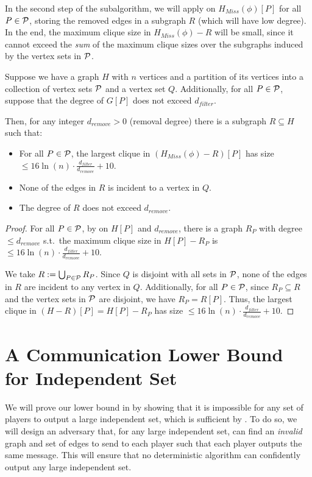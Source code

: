 \documentclass[11pt]{article}
\begin{document}
In the second step of the subalgorithm, we will apply  on $H_{Miss}(\phi)[P]$ for all $P\in \mathcal{P}$, storing the removed edges in a subgraph $R$ (which will have low degree). In the end, the maximum clique size in $H_{Miss}(\phi)-R$ will be small, since it cannot exceed the \textit{sum} of the maximum clique sizes over the subgraphs induced by the vertex sets in $\mathcal{P}$.

\begin{lemma}\label{algo-second-step}
Suppose we have a graph $H$ with $n$ vertices and a partition of its vertices into a collection of vertex sets $\mathcal{P}$ and a vertex set $Q$. Additionally, for all $P\in \mathcal{P}$, suppose that the degree of $G[P]$ does not exceed $d_{filter}$.

Then, for any integer $d_{remove}>0$ (removal degree) there is a subgraph $R\subseteq H$ such that: 
\begin{itemize}
\item For all $P\in \mathcal{P}$, the largest clique in $(H_{Miss}(\phi)-R)[P]$ has size $\le 16\ln(n)\cdot \frac{d_{filter}}{d_{remove}}+10$. 
\item None of the edges in $R$ is incident to a vertex in $Q$. 
\item The degree of $R$ does not exceed $d_{remove}$. 
\end{itemize}
\end{lemma}
\begin{proof}
For all $P\in \mathcal{P}$, by  on $H[P]$ and $d_{remove}$, there is a graph $R_P$ with degree $\le d_{remove}$ s.t.\ the maximum clique size in $H[P]-R_P$ is $\le 16\ln(n)\cdot\frac{d_{filter}}{d_{remove}}+10$. 

We take $R:=\bigcup_{P\in \mathcal{P}}R_P$. Since $Q$ is disjoint with all sets in $\mathcal{P}$, none of the edges in $R$ are incident to any vertex in $Q$. Additionally, for all $P\in \mathcal{P}$, since $R_P\subseteq R$ and the vertex sets in $\mathcal{P}$ are disjoint, we have $R_P=R[P]$. Thus, the largest clique in $(H-R)[P]=H[P]-R_P$ has size $\le 16\ln(n)\cdot\frac{d_{filter}}{d_{remove}}+10$.
\end{proof}

\section{A Communication Lower Bound for Independent Set}

We will prove our lower bound in  by showing that it is impossible for any set of players to output a large independent set, which is sufficient by . To do so, we will design an adversary that, for any large independent set, can find an \textit{invalid} graph and set of edges to send to each player such that each player outputs the same message. This will ensure that no deterministic algorithm can confidently output any large independent set. 
\end{document}
